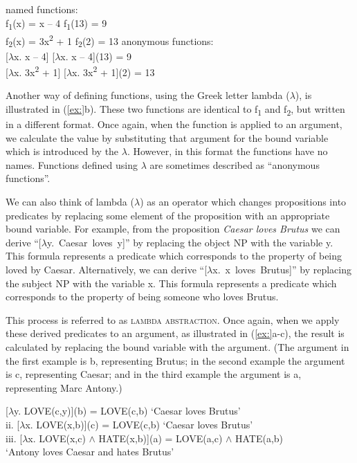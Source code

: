 \ea
\ea  named functions:\\
f\textsubscript{1}(x) = x – 4  f\textsubscript{1}(13) = 9\\
f\textsubscript{2}(x) = 3x\textsuperscript{2} + 1  f\textsubscript{2}(2) = 13
\ex  anonymous functions:\\
{}[$\lambda $x. x – 4]  [$\lambda $x. x – 4](13) = 9\\
{}[$\lambda $x. 3x\textsuperscript{2} + 1]  [$\lambda $x. 3x\textsuperscript{2} + 1](2) = 13
\z \z


Another way of defining functions, using the Greek letter lambda ($\lambda $), is illustrated in (\ref{ex:}b). These two functions are identical to f\textsubscript{1} and f\textsubscript{2}, but written in a different format. Once again, when the function is applied to an argument, we calculate the value by substituting that argument for the bound variable which is introduced by the $\lambda $. However, in this format the functions have no names. Functions defined using $\lambda $ are sometimes described as “anonymous functions”.



We can also think of lambda ($\lambda $) as an operator which changes propositions into predicates by replacing some element of the proposition with an appropriate bound variable. For example, from the proposition \textit{Caesar loves Brutus} we can derive “[$\lambda $y.~Caesar~loves~y]” by replacing the object NP with the variable y. This formula represents a predicate which corresponds to the property of being loved by Caesar. Alternatively, we can derive “[$\lambda $x.~x~loves~Brutus]” by replacing the subject NP with the variable x. This formula represents a predicate which corresponds to the property of being someone who loves Brutus.



This process is referred to as \textsc{lambda abstraction}. Once again, when we apply these derived predicates to an argument, as illustrated in (\ref{ex:}a-c), the result is calculated by replacing the bound variable with the argument. (The argument in the first example is b, representing Brutus; in the second example the argument is c, representing Caesar; and in the third example the argument is a, representing Marc Antony.)


\ea
\ex{} [$\lambda $y. LOVE(c,y)](b) = LOVE(c,b) ‘Caesar loves Brutus’\\
ii. [$\lambda $x. LOVE(x,b)](c) = LOVE(c,b) ‘Caesar loves Brutus’\\
iii. [$\lambda $x. LOVE(x,c) $\wedge$ HATE(x,b)](a) = LOVE(a,c) $\wedge$ HATE(a,b)\\
  ‘Antony loves Caesar and hates Brutus’
\z


